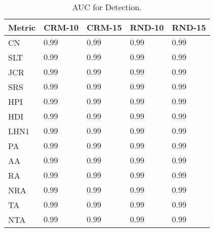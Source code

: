 
\begin{table}[h]
	\centering
	\begin{tabular}{l l l l l}
	\toprule
	\textbf{Metric} & \textbf{CRM-10} & \textbf{CRM-15} & \textbf{RND-10} & \textbf{RND-15}\\
	\midrule
		CN & $0.99$ & $0.99$ & $0.99$ & $0.99$ \\
		SLT  & $0.99$ & $0.99$ & $0.99$ & $0.99$ \\
		JCR  & $0.99$ & $0.99$ & $0.99$ & $0.99$ \\
		SRS   & $0.99$ & $0.99$ & $0.99$ & $0.99$ \\
		HPI  & $0.99$ & $0.99$ & $0.99$ & $0.99$ \\
		HDI  & $0.99$ & $0.99$ & $0.99$ & $0.99$ \\
		LHN1  & $0.99$ & $0.99$ & $0.99$ & $0.99$ \\
		PA  & $0.99$ & $0.99$ & $0.99$ & $0.99$ \\
		AA  & $0.99$ & $0.99$ & $0.99$ & $0.99$ \\
		RA  & $0.99$ & $0.99$ & $0.99$ & $0.99$ \\
		NRA  & $0.99$ & $0.99$ & $0.99$ & $0.99$ \\
		TA  & $0.99$ & $0.99$ & $0.99$ & $0.99$ \\
		NTA  & $0.99$ & $0.99$ & $0.99$ & $0.99$ \\
	\bottomrule
	\end{tabular}
	\label{tab:auc-detection}
	\caption{AUC for Detection.}
\end{table}

